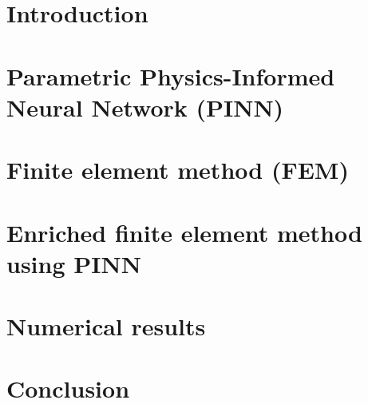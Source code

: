 \documentclass[compress,10pt,xcolor={table,dvipsnames},t]{beamer} %
\newcommand{\insertsectionheadSubtitle}{}
\begin{document}
	\section*{Introduction}
	

	
	\renewcommand{\insertsectionheadSubtitle}{The PINN is parametrized by the $\bm{\mu}$ parameter.}
	\section[Parametric PINN]{Parametric Physics-Informed Neural Network (PINN)}
	
	\renewcommand{\insertsectionheadSubtitle}{}

	\renewcommand{\insertsectionheadSubtitle}{The $\bm{\mu}$ parameter is fixed in the FE resolution.}
	\section{Finite element method (FEM)}
	
	\renewcommand{\insertsectionheadSubtitle}{}

	\section{Enriched finite element method using PINN}
	

	\renewcommand{\insertsectionheadSubtitle}{
		\begin{itemize}
			\item Results obtained with a laptop GPU.
			\item The newton solver is the same for all methods (rtol$=10^{-10}$, atol$=10^{-10}$, max\_it$=30$).
			\item Additive approach : we consider $u_\theta$ in a $\mathbb{P}_3^2\times \mathbb{P}_2 \times \mathbb{P}_3$ continuous Lagrange FE space (defined on the current mesh).
		\end{itemize}}
	\section{Numerical results}
	
	\renewcommand{\insertsectionheadSubtitle}{}

	\section*{Conclusion}
\end{document}
